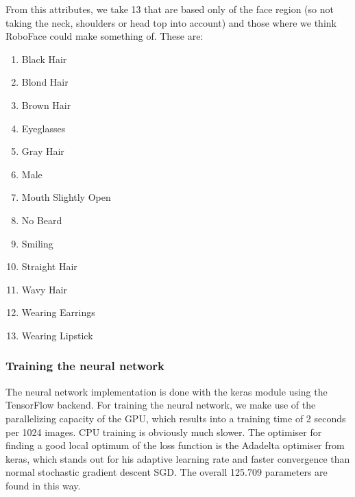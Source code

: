 \documentclass[12.5pt]{scrartcl}
\begin{document}
	From this attributes, we take 13 that are based only of the face region (so not taking the neck, shoulders or head top into account) and those where we think RoboFace could make something of. These are:
		\begin{enumerate}
			\item Black Hair
			\item Blond Hair
			\item Brown Hair
			\item Eyeglasses
			\item Gray Hair
			\item Male
			\item Mouth Slightly Open
			\item No Beard
			\item Smiling
			\item Straight Hair
			\item Wavy Hair
			\item Wearing Earrings
			\item Wearing Lipstick
		\end{enumerate}
	\subsubsection{Training the neural network}
	The neural network implementation is done with the keras module using the TensorFlow backend. For training the neural network, we make use of the parallelizing capacity of the GPU, which results into a training time of 2 seconds per 1024 images. CPU training is obviously much slower.
	The optimiser for finding a good local optimum of the loss function is the Adadelta optimiser from keras, which stands out for his adaptive learning rate and faster convergence than normal stochastic gradient descent SGD. The overall 125.709 parameters are found in this way.
\end{document}
